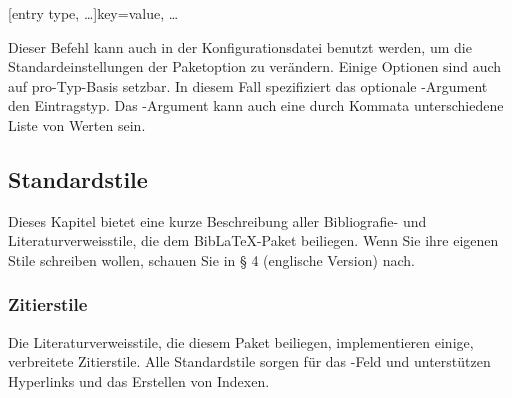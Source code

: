 \documentclass{ltxdockit}[2011/03/25]
\newcommand*{\biblatex}{BibLaTeX\xspace}
\begin{document}
\begin{ltxsyntax}

[entry type, \dots]{key=value, \dots} 

Dieser Befehl kann auch in der Konfigurationsdatei benutzt werden, um die
Standardeinstellungen der Paketoption zu verändern. Einige Optionen sind auch
auf pro-Typ-Basis setzbar. In diesem Fall spezifiziert das optionale -Argument den Eintragstyp. Das -Argument kann auch eine
durch Kommata unterschiedene Liste von Werten sein.

\end{ltxsyntax}

\subsection{Standardstile} \label{use:xbx}

Dieses Kapitel bietet eine kurze
Beschreibung aller Bibliografie- und Literaturverweisstile, die dem
\biblatex-Paket beiliegen. Wenn Sie ihre eigenen Stile schreiben wollen, 
schauen Sie in %
§ 4 (englische Version) nach.

\subsubsection{Zitierstile} \label{use:xbx:cbx} 

Die Literaturverweisstile, die diesem Paket beiliegen, implementieren einige, 
verbreitete Zitierstile. Alle
Standardstile sorgen für das -Feld und
unterstützen Hyperlinks und das Erstellen von Indexen.
\end{document}
